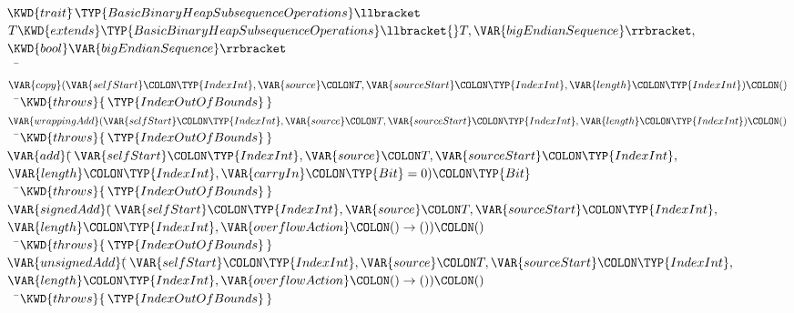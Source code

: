 \begin{Fortress}
\(\KWD{trait} \null\)\pushtabs\=\+\(\TYP{BasicBinaryHeapSubsequenceOperations}\llbracket\)\\
\(      T \KWD{extends} \TYP{BasicBinaryHeapSubsequenceOperations}\llbracket{}T,\VAR{bigEndianSequence}\rrbracket,\)\\
\(      \KWD{bool} \VAR{bigEndianSequence}\rrbracket\)\-\\\poptabs
{\tt~~}\pushtabs\=\+\(  \VAR{copy}(\VAR{selfStart}\COLON \TYP{IndexInt}, \VAR{source}\COLON T, \VAR{sourceStart}\COLON \TYP{IndexInt}, \VAR{length}\COLON \TYP{IndexInt})\COLON ()\)\\
{\tt~~}\pushtabs\=\+\(    \KWD{throws} \{\,\TYP{IndexOutOfBounds}\,\}\)\-\\\poptabs
\(  \VAR{wrappingAdd}(\VAR{selfStart}\COLON \TYP{IndexInt}, \VAR{source}\COLON T, \VAR{sourceStart}\COLON \TYP{IndexInt}, \VAR{length}\COLON \TYP{IndexInt})\COLON ()\)\\
{\tt~~}\pushtabs\=\+\(    \KWD{throws} \{\,\TYP{IndexOutOfBounds}\,\}\)\-\\\poptabs
\(  \VAR{add}(\null\)\pushtabs\=\+\(\VAR{selfStart}\COLON \TYP{IndexInt}, \VAR{source}\COLON T, \VAR{sourceStart}\COLON \TYP{IndexInt},\)\\
\(      \VAR{length}\COLON \TYP{IndexInt}, \VAR{carryIn}\COLON \TYP{Bit}=0)\COLON \TYP{Bit}\)\-\\\poptabs
{\tt~~}\pushtabs\=\+\(    \KWD{throws} \{\,\TYP{IndexOutOfBounds}\,\}\)\-\\\poptabs
\(  \VAR{signedAdd}(\null\)\pushtabs\=\+\(\VAR{selfStart}\COLON \TYP{IndexInt}, \VAR{source}\COLON T, \VAR{sourceStart}\COLON \TYP{IndexInt},\)\\
\(            \VAR{length}\COLON \TYP{IndexInt}, \VAR{overflowAction}\COLON ()\rightarrow())\COLON ()\)\-\\\poptabs
{\tt~~}\pushtabs\=\+\(    \KWD{throws} \{\,\TYP{IndexOutOfBounds}\,\}\)\-\\\poptabs
\(  \VAR{unsignedAdd}(\null\)\pushtabs\=\+\(\VAR{selfStart}\COLON \TYP{IndexInt}, \VAR{source}\COLON T, \VAR{sourceStart}\COLON \TYP{IndexInt},\)\\
\(              \VAR{length}\COLON \TYP{IndexInt}, \VAR{overflowAction}\COLON ()\rightarrow())\COLON ()\)\-\\\poptabs
{\tt~~}\pushtabs\=\+\(    \KWD{throws} \{\,\TYP{IndexOutOfBounds}\,\}\)\-\\\poptabs

\end{Fortress}
